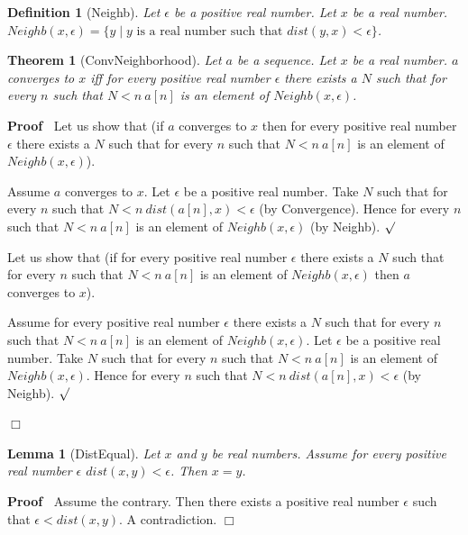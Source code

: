 \documentclass{article}
\newenvironment{forthel}{\begin{leftbar}}{\end{leftbar}}
\newenvironment{proof}{\noindent\textbf{Proof\ }}{\hspace*{\fill}$\Box$\medskip}
\newenvironment{subproof}{\begin{list}{}{}
		\item[\text{Proof}]}{\hfill $\surd$ \end{list}}
\newtheorem{lemma}{Lemma}
\newtheorem{theorem}{Theorem}
\newtheorem{definition}{Definition}
\begin{document}
\begin{forthel}
	\begin{definition}[Neighb]
		Let $\epsilon$ be a positive real number. Let $x$ be a real number.
		$Neighb(x,\epsilon) = \{y \mid y \text{ is a real number such that } dist(y,x) < \epsilon\}$.
	\end{definition}
	
	\begin{theorem}[ConvNeighborhood]
		Let $a$ be a sequence. Let $x$ be a real number.
		$a$ converges to $x$ iff for every positive real number $\epsilon$ there exists a $N$
		such that for every $n$ such that $N < n \ a[n]$ is an element of $Neighb(x,\epsilon)$.
	\end{theorem}

	\begin{proof}
		Let us show that (if $a$ converges to $x$ then for every positive real number $\epsilon$ there exists a $N$
		such that for every $n$ such that $N < n \ a[n]$ is an element of $Neighb(x,\epsilon)$).
		\begin{subproof}
			Assume $a$ converges to $x$.
			Let $\epsilon$ be a positive real number.
			Take $N$ such that for every $n$ such that $N < n \ dist(a[n],x) < \epsilon$ (by Convergence).
			Hence for every $n$ such that $N < n \ a[n]$ is an element of $Neighb(x,\epsilon)$ (by Neighb).
		\end{subproof}
	
		Let us show that (if for every positive real number $\epsilon$ there exists a $N$ such that
		for every $n$ such that $N < n \ a[n]$ is an element of $Neighb(x,\epsilon)$ then $a$ converges to $x$).
		\begin{subproof}
			Assume for every positive real number $\epsilon$ there exists a $N$ such that
			for every $n$ such that $N < n \ a[n]$ is an element of $Neighb(x,\epsilon)$.
			Let $\epsilon$ be a positive real number.
			Take $N$ such that for every $n$ such that $N < n \ a[n]$ is an element of $Neighb(x,\epsilon)$.
			Hence for every $n$ such that $N < n \ dist(a[n],x) < \epsilon$ (by Neighb).
		\end{subproof}
	\end{proof}	
	
	\begin{lemma}[DistEqual]
		Let $x$ and $y$ be real numbers. Assume for every positive real number $\epsilon$ $dist(x,y) < \epsilon$.
		Then $x = y$.
	\end{lemma}

	\begin{proof}
		Assume the contrary.
		Then there exists a positive real number $\epsilon$ such that $\epsilon < dist(x,y)$.
		A contradiction.
	\end{proof}
	

\end{forthel}
\end{document}

